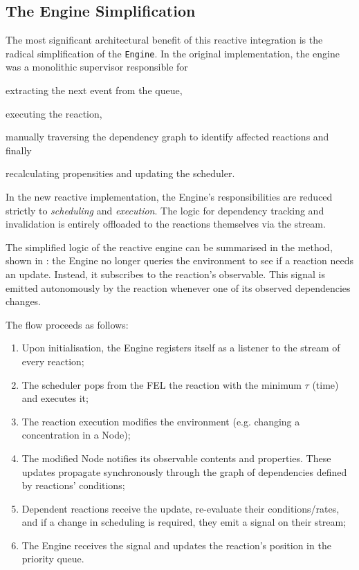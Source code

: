 \subsection{The Engine Simplification}
The most significant architectural benefit of this reactive integration is the
radical simplification of the \texttt{Engine}. In the original implementation,
the engine was a monolithic supervisor responsible for
\begin{enumerate*}[label=(\roman*)]
	\item extracting the next event from the queue,
	\item executing the reaction,
	\item manually traversing the dependency graph to identify affected
	      reactions and finally
	\item recalculating propensities and updating the scheduler.
\end{enumerate*}
In the new reactive implementation, the Engine's responsibilities are reduced
strictly to \emph{scheduling} and \emph{execution}. The logic for
dependency tracking and invalidation is entirely offloaded to the reactions
themselves via the \linebreak{} stream.

The simplified logic of the reactive engine can be summarised in the
\linebreak{} method, shown in : the
Engine no longer queries the environment to see if a reaction needs an update.
Instead, it subscribes to the reaction's  observable.
This signal is emitted autonomously by the reaction whenever one of its
observed dependencies changes.


The flow proceeds as follows:
\begin{enumerate}
	\item Upon initialisation, the Engine registers itself as a listener to the
	      \linebreak{} stream of every reaction;
	\item The scheduler pops from the \ac{FEL} the reaction with the minimum
	      $\tau$ (time) and executes it;
	\item The reaction execution modifies the environment (e.g. changing a
	      concentration in a Node);
	\item The modified Node notifies its observable contents and properties.
	      These updates propagate synchronously through the graph of dependencies
	      defined by reactions' conditions;
	\item Dependent reactions receive the update, re-evaluate their
	      conditions/rates, and if a change in scheduling is required, they emit
	      a signal on their \linebreak{} stream;
	\item The Engine receives the signal and updates the reaction's position in
	      the priority queue.
\end{enumerate}

